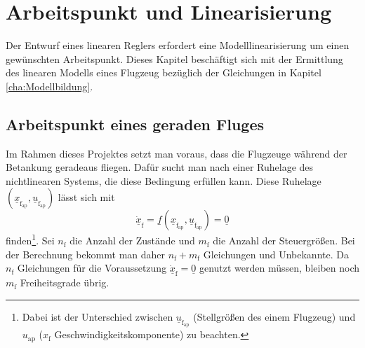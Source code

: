 \chapter{Arbeitspunkt und Linearisierung}\label{cha:Linearisierung}
Der Entwurf eines linearen Reglers erfordert eine Modelllinearisierung um einen gewünschten Arbeitspunkt. Dieses Kapitel beschäftigt sich mit der Ermittlung des linearen Modells eines Flugzeug bezüglich der Gleichungen in Kapitel \ref{cha:Modellbildung}.
\section{Arbeitspunkt eines geraden Fluges}
Im Rahmen dieses Projektes setzt man voraus, dass die Flugzeuge während der Betankung geradeaus fliegen. Dafür sucht man nach einer Ruhelage des nichtlinearen Systems, die diese Bedingung erfüllen kann. Diese Ruhelage $(\underline{x}_\mathrm{f_{ap}},\underline{u}_\mathrm{f_{ap}})$ lässt sich mit
\begin{equation}
\underline{\dot{x}}_\mathrm{f} = \underline{f}(\underline{x}_\mathrm{f_{ap}},\underline{u}_\mathrm{f_{ap}}) = \underline{0}
\end{equation}
finden\footnote{Dabei ist der Unterschied zwischen $\underline{u}_\mathrm{f_{ap}}$ (Stellgrö{\ss}en des einem Flugzeug) und $u_\mathrm{ap}$ ($x_\mathrm{f}$ Geschwindigkeitskomponente) zu beachten.}. Sei $n_\mathrm{f}$ die Anzahl der Zustände und $m_\mathrm{f}$ die Anzahl der Steuergrö{\ss}en. Bei der Berechnung bekommt man daher $n_\mathrm{f}+m_\mathrm{f}$ Gleichungen und Unbekannte. Da $n_\mathrm{f}$ Gleichungen für die Voraussetzung $\underline{\dot{x}}_\mathrm{f} = \underline{0}$ genutzt werden müssen, bleiben noch $m_\mathrm{f}$ Freiheitsgrade übrig.\\

